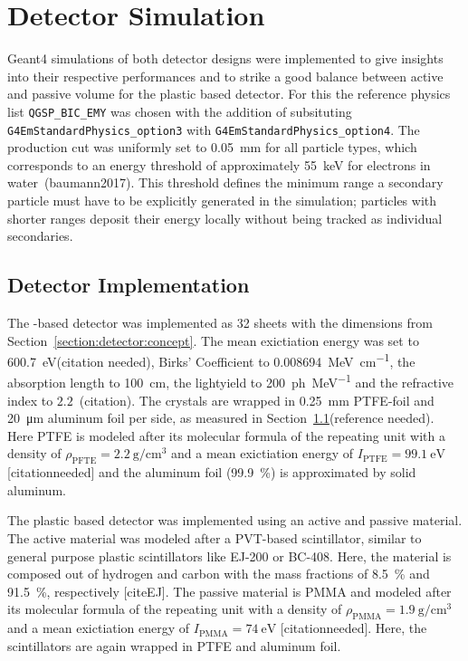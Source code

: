 \section{Detector Simulation}
Geant4 simulations of both detector designs were implemented to give insights into their respective performances and to strike a good balance between active and passive volume for the plastic based detector.
For this the reference physics list \texttt{QGSP\_BIC\_EMY} was chosen with the addition of subsituting \texttt{G4EmStandardPhysics\_option3} with \texttt{G4EmStandardPhysics\_option4}.
The production cut was uniformly set to \SI{0.05}{\milli\meter} for all particle types, which corresponds to an energy threshold of approximately \SI{55}{\kilo\electronvolt} for electrons in water~\cite{}(baumann2017). This threshold defines the minimum range a secondary particle must have to be explicitly generated in the simulation; particles with shorter ranges deposit their energy locally without being tracked as individual secondaries.

\subsection{Detector Implementation}
The -based detector was implemented as 32  sheets with the dimensions from Section~\ref{section:detector:concept}.
The mean exictiation energy was set to \SI{600.7}{\electronvolt}(citation needed), Birks' Coefficient to \SI{0.008694}{\mega\electronvolt\per\centi\meter}, the absorption length to \SI{100}{\centi\meter}, the lightyield to \SI{200}{ph\per\mega\electronvolt} and the refractive index to $2.2$~(citation). 
The crystals are wrapped in \SI{0.25}{\mm} PTFE-foil and \SI{20}{\um} aluminum foil per side, as measured in Section~\ref{}(reference needed).
Here PTFE is modeled after its molecular formula of the repeating unit  with a density of $\rho_{\text{PFTE}}=\SI{2.2}{\gram\per\cm\cubed}$ and a mean exictiation energy of $I_{\text{PTFE}} = \SI{99.1}{\electronvolt}$  [citationneeded] and the aluminum foil (\SI{99.9}{\percent}) is approximated by solid aluminum. 

The plastic based detector was implemented using an active and passive material.
The active material was modeled after a PVT-based scintillator, similar to general purpose plastic scintillators like EJ-200 or BC-408.
Here, the material is composed out of hydrogen and carbon with the mass fractions of \SI{8.5}{\percent} and \SI{91.5}{\percent}, respectively [citeEJ].
The passive material is PMMA and modeled after its molecular formula of the repeating unit  with a density of $\rho_{\text{PMMA}}=\SI{1.9}{\gram\per\cm\cubed}$ and a mean exictiation energy of $I_{\text{PMMA}} = \SI{74}{\electronvolt}$ [citationneeded]. 
Here, the scintillators are again wrapped in PTFE and aluminum foil.

